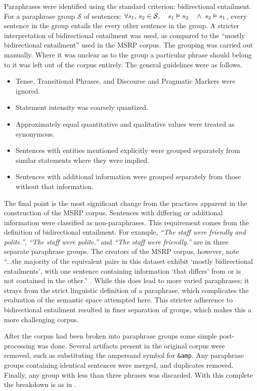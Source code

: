 \documentclass[]{book}
\begin{document}
Paraphrases were identified using the standard criterion: bidirectional
entailment. For a paraphrase group $\mathcal{S}$ of sentences: $\forall s_{1},\,s_{2}\in\mathcal{S},\quad s_{1}\vDash s_{2}\quad\wedge\;s_{2}\vDash s_{1}$,
every sentence in the group entails the every other sentence in the
group. A stricter interpretation of bidirectional entailment was used,
as compared to the ``mostly bidirectional entailment'' used in the
MSRP corpus. The grouping was carried out manually. Where it was unclear
as to the group a particular phrase should belong to it was left out
of the corpus entirely. The general guidelines were as follows.
\begin{itemize}
\item Tense, Transitional Phrases, and Discourse and Pragmatic Markers were
ignored.
\item Statement intensity was coarsely quantized. 
\item Approximately equal quantitative and qualitative values were treated
as synonymous.
\item Sentences with entities mentioned explicitly were grouped separately
from similar statements where they were implied.
\item Sentences with additional information were grouped separately from
those without that information.
\end{itemize}
The final point is the most significant change from the practices
apparent in the construction of the MSRP corpus. Sentences with differing
or additional information were classified as non-paraphrases. This
requirement comes from the definition of bidirectional entailment.
For example, \emph{``The staff were friendly and polite.''}, \emph{``The
staff were polite.''} and \emph{``The staff were friendly.''} are
in three separate paraphrase groups. The creators of the MSRP corpus,
however, note ``...the majority of the equivalent pairs in this dataset
exhibit `mostly bidirectional entailments', with one sentence containing
information `that differs' from or is not contained in the other.''
\cite{msrParapharaCorpus}. While this does lead to more varied paraphrases;
it strays from the strict linguistic definition of a paraphrase, which
complicates the evaluation of the semantic space attempted here. This
stricter adherence to bidirectional entailment resulted in finer separation
of groups, which makes this a more challenging corpus.

After the corpus had been broken into paraphrase groups some simple
post-processing was done. Several artifacts present in the original
corpus were removed, such as substituting the ampersand symbol for
\texttt{\&amp}. Any paraphrase groups containing identical sentences
were merged, and duplicates removed. Finally, any group with less
than three phrases was discarded. With this complete the breakdown
is as in .
\end{document}
